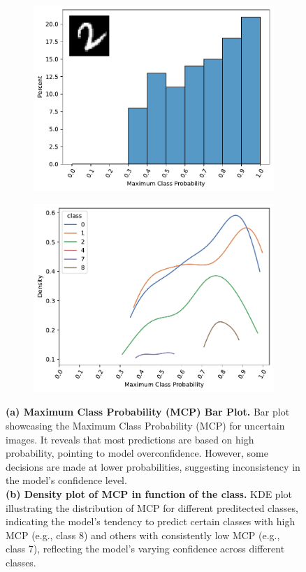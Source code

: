 \begin{figure}[hp]
    \centering
    \begin{subfigure}{0.45\textwidth}
        \includegraphics[width=\textwidth]{MCP_barplot.pdf}
        \caption{}
        \label{fig:MCP:barplot}
    \end{subfigure}%
    \begin{subfigure}{0.45\textwidth}
        \includegraphics[width=\textwidth]{MCP_kdeplot.pdf}
        \caption{}
        \label{fig:MCP:kdeplot}
    \end{subfigure}%
    \caption{\textbf{(a) Maximum Class Probability (MCP) Bar Plot.} Bar plot showcasing the Maximum Class Probability (MCP) for uncertain images. It reveals that most predictions are based on high probability, pointing to model overconfidence. However, some decisions are made at lower probabilities, suggesting inconsistency in the model's confidence level.\\\textbf{(b) Density plot of MCP in function of the class.} KDE plot illustrating the distribution of MCP for different preditected classes, indicating the model's tendency to predict certain classes with high MCP (e.g., class 8) and others with consistently low MCP (e.g., class 7), reflecting the model's varying confidence across different classes.}
    \label{fig:MCP}
\end{figure}

